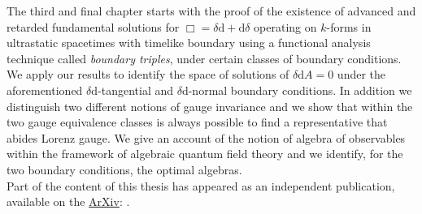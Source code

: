 The third and final chapter starts with the proof of the existence of advanced and retarded fundamental solutions for $\Box=\delta\mathrm{d}+\mathrm{d}\delta$ operating on $k$-forms in ultrastatic spacetimes with timelike boundary using a functional analysis technique called \emph{boundary triples}, under certain classes of boundary conditions. We apply our results to identify the space of solutions of $\delta\mathrm{d} A=0$ under the aforementioned $\delta\mathrm{d}$-tangential and $\delta\mathrm{d}$-normal boundary conditions. In addition we distinguish two different notions of gauge invariance and we show that within the two gauge equivalence classes is always possible to find a representative that abides Lorenz gauge. We give an account of the notion of algebra of observables within the framework of algebraic quantum field theory and we identify, for the two boundary conditions, the optimal algebras.\\

Part of the content of this thesis has appeared as an independent 
publication, available on the \hyperref{https://arxiv.org/abs/1908.09504}{}{}{ArXiv}: \cite{DDL19}.








